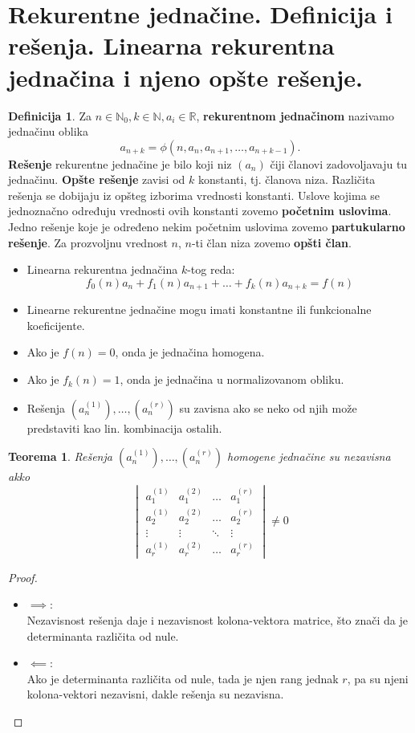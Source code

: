 \documentclass[a4paper,12pt]{article}
\numberwithin{algorithm}{section}
\theoremstyle{plain}
\newtheorem{theorem}{Teorema}[section]
\theoremstyle{definition}
\newtheorem{definition}{Definicija}[section]
\theoremstyle{remark}
\begin{document}
\section{Rekurentne jednačine. Definicija i rešenja. Linearna rekurentna jednačina i
njeno opšte rešenje. }
\begin{definition}
    Za $n \in \mathbb{N}_0, k\in \mathbb{N}, a_i \in \mathbb{R}$, \textbf{rekurentnom jednačinom} nazivamo jednačinu oblika
    \[ a_{n+k} = \phi(n, a_n, a_{n+1}, \ldots, a_{n+k-1}).\]
    \textbf{Rešenje} rekurentne jednačine je bilo koji niz $(a_n)$ čiji članovi zadovoljavaju tu jednačinu. \textbf{Opšte rešenje} zavisi od $k$ konstanti, tj. članova niza. Različita rešenja se dobijaju iz opšteg izborima vrednosti konstanti. Uslove kojima se jednoznačno određuju vrednosti ovih konstanti zovemo \textbf{početnim uslovima}. Jedno rešenje koje je određeno nekim početnim uslovima zovemo \textbf{partukularno rešenje}. Za prozvoljnu vrednost $n$, $n$-ti član niza zovemo \textbf{opšti član}.
\end{definition}
\begin{itemize}
    \item Linearna rekurentna jednačina $k$-tog reda:
    \[
        f_0(n)a_n + f_1(n)a_{n+1} + \dots + f_k(n)a_{n + k} = f(n)
    \]
    \item Linearne rekurentne jednačine mogu imati konstantne ili funkcionalne koeficijente.
    \item Ako je $f(n) = 0$, onda je jednačina homogena.
    \item Ako je $f_k(n) = 1$, onda je jednačina u normalizovanom obliku.
    \item Rešenja $(a_n^{(1)}), \ldots, (a_n^{(r)})$ su zavisna ako se neko od njih može predstaviti kao lin. kombinacija ostalih.
\end{itemize}
\begin{theorem}
    Rešenja $(a_n^{(1)}), \ldots, (a_n^{(r)})$ homogene jednačine su nezavisna akko
    \[ \begin{vmatrix} 
        a_1^{(1)} & a_1^{(2)} & \ldots & a_1^{(r)} \\ 
        a_2^{(1)} & a_2^{(2)} & \ldots & a_2^{(r)} \\ 
        \vdots & \vdots & \ddots &\vdots \\ 
        a_r^{(1)} & a_r^{(2)} & \ldots & a_r^{(r)} 
    \end{vmatrix} \neq 0\]
\end{theorem}
\begin{proof}\
    \begin{itemize}
        \item $\implies$: \\
        Nezavisnost rešenja daje i nezavisnost kolona-vektora matrice, što znači da je determinanta različita od nule.
        \item $\impliedby$: \\
        Ako je determinanta različita od nule, tada je njen rang jednak $r$, pa su njeni kolona-vektori nezavisni, dakle rešenja su nezavisna.
    \end{itemize}
\end{proof}
\end{document}
